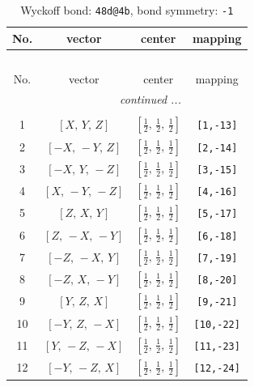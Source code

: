 \documentclass[fleqn,8pt]{jsarticle}
\begin{document}
\begin{longtable}{cccc}
\caption{Wyckoff bond: {\tt 48d@4b}, bond symmetry: {\tt -1}}
 \\
 \hline \hline
No. & vector & center & mapping \\ \hline \endfirsthead

\multicolumn{3}{l}{\tablename\ \thetable{}} \\
 \hline \hline
No. & vector & center & mapping \\ \hline \endhead

 \hline \hline
\multicolumn{3}{r}{\footnotesize\it continued ...} \\ \endfoot

 \hline \hline
\multicolumn{3}{r}{} \\ \endlastfoot

1 & $\left[ X,\, Y,\, Z \right]$ & $\left[ \frac{1}{2},\, \frac{1}{2},\, \frac{1}{2} \right]$ & {\tt [1,-13]} \\ \hline
2 & $\left[ - X,\, - Y,\, Z \right]$ & $\left[ \frac{1}{2},\, \frac{1}{2},\, \frac{1}{2} \right]$ & {\tt [2,-14]} \\ \hline
3 & $\left[ - X,\, Y,\, - Z \right]$ & $\left[ \frac{1}{2},\, \frac{1}{2},\, \frac{1}{2} \right]$ & {\tt [3,-15]} \\ \hline
4 & $\left[ X,\, - Y,\, - Z \right]$ & $\left[ \frac{1}{2},\, \frac{1}{2},\, \frac{1}{2} \right]$ & {\tt [4,-16]} \\ \hline
5 & $\left[ Z,\, X,\, Y \right]$ & $\left[ \frac{1}{2},\, \frac{1}{2},\, \frac{1}{2} \right]$ & {\tt [5,-17]} \\ \hline
6 & $\left[ Z,\, - X,\, - Y \right]$ & $\left[ \frac{1}{2},\, \frac{1}{2},\, \frac{1}{2} \right]$ & {\tt [6,-18]} \\ \hline
7 & $\left[ - Z,\, - X,\, Y \right]$ & $\left[ \frac{1}{2},\, \frac{1}{2},\, \frac{1}{2} \right]$ & {\tt [7,-19]} \\ \hline
8 & $\left[ - Z,\, X,\, - Y \right]$ & $\left[ \frac{1}{2},\, \frac{1}{2},\, \frac{1}{2} \right]$ & {\tt [8,-20]} \\ \hline
9 & $\left[ Y,\, Z,\, X \right]$ & $\left[ \frac{1}{2},\, \frac{1}{2},\, \frac{1}{2} \right]$ & {\tt [9,-21]} \\ \hline
10 & $\left[ - Y,\, Z,\, - X \right]$ & $\left[ \frac{1}{2},\, \frac{1}{2},\, \frac{1}{2} \right]$ & {\tt [10,-22]} \\ \hline
11 & $\left[ Y,\, - Z,\, - X \right]$ & $\left[ \frac{1}{2},\, \frac{1}{2},\, \frac{1}{2} \right]$ & {\tt [11,-23]} \\ \hline
12 & $\left[ - Y,\, - Z,\, X \right]$ & $\left[ \frac{1}{2},\, \frac{1}{2},\, \frac{1}{2} \right]$ & {\tt [12,-24]} \\
\end{longtable}
\end{document}
